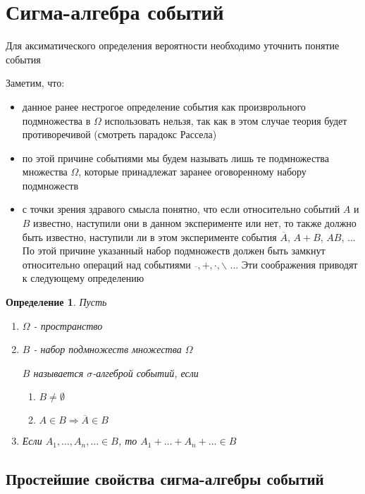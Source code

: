 \documentclass[a4paper, 14pt]{report}
\newtheorem{defenition}{Определение}[chapter]
\begin{document}
\section{Сигма-алгебра событий}

Для аксиматического определения вероятности необходимо уточнить понятие события

Заметим, что:

\begin{itemize}
    \item данное ранее нестрогое определение события как произврольного подмножества в $\Omega$ использовать нельзя, так как в этом случае теория будет противоречивой (смотреть парадокс Рассела)
    \item по этой причине событиями мы будем называть лишь те подмножества множества $\Omega$, которые принадлежат заранее оговоренному набору подмножеств
    \item с точки зрения здравого смысла понятно, что если относительно событий $A$ и $B$ известно, наступили они в данном эксперименте или нет, то также должно быть известно, наступили ли в этом эксперименте события $\overline{A}$, $A+B$, $AB$, ... По этой причине указанный набор подмножеств должен быть замкнут относительно операций над событиями $\overline{}, +, \cdot, \backslash$ ... Эти соображения приводят к следующему определению
\end{itemize}

\begin{defenition}
    Пусть
    \begin{enumerate}
        \item $\Omega$ - пространство 
        \item $B$ - набор подмножеств множества $\Omega$

            $B$ называется $\sigma$-алгеброй событий, если
            \begin{enumerate}
                \item $B \ne \emptyset$
                \item $A \in B \Rightarrow \overline{A} \in B$
            \end{enumerate}

        \item Если $A_1, \dots, A_n, \dots \in B$, то $A_1 + \dots + A_n + \dots \in B$
    \end{enumerate}
\end{defenition}

\subsection{Простейшие свойства сигма-алгебры событий}
\end{document}
